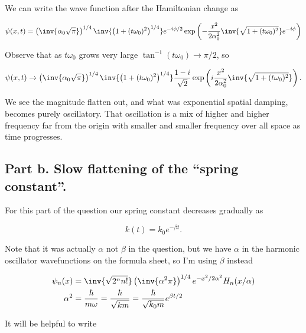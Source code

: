 We can write the wave function after the Hamiltonian change as

\begin{equation}\label{eqn:qmTwoExamReflection:310b}
\psi(x, t) = 
\left( \inv{\alpha_0 \sqrt{\pi}} \right)^{1/4}
\inv{\left( 1 + (t \omega_0)^2 \right)^{1/4}}
e^{-i \phi/2}
\exp\left(
-\frac{x^2}{2 \alpha_0^2} \inv{\sqrt{1 + (t \omega_0)^2}} e^{-i \phi}
\right)
\end{equation}

Observe that as $t \omega_0$ grows very large $\tan^{-1}(t \omega_0) \rightarrow \pi/2$, so 

\begin{equation}\label{eqn:qmTwoExamReflection:310c}
\psi(x, t) \rightarrow
\left( \inv{\alpha_0 \sqrt{\pi}} \right)^{1/4}
\inv{\left( 1 + (t \omega_0)^2 \right)^{1/4}}
\frac{1 - i}{\sqrt{2}}
\exp\left(
i\frac{x^2}{2 \alpha_0^2} \inv{\sqrt{1 + (t \omega_0)^2}} 
\right).
\end{equation}

We see the magnitude flatten out, and what was exponential spatial damping, becomes purely oscillatory.  That oscillation is a mix of higher and higher frequency far from the origin with smaller and smaller frequency over all space as time progresses.

\subsection{Part b.  Slow flattening of the ``spring constant''.}

For this part of the question our spring constant decreases gradually as

\begin{equation}\label{eqn:qmTwoExamReflection:990}
k(t) = k_0 e^{-\beta t}.
\end{equation}

Note that it was actually $\alpha$ not $\beta$ in the question, but we have $\alpha$ in the harmonic oscillator wavefunctions on the formula sheet, so I'm using $\beta$ instead

\begin{align}\label{eqn:qmTwoExamReflection:1010}
\psi_n(x) &= \inv{\sqrt{2^n n!}} \left(\inv{\alpha^2 \pi}\right)^{1/4} e^{-x^2/2\alpha^2} H_n(x/\alpha) \\
\alpha^2 &= \frac{\hbar}{m \omega} 
= \frac{\hbar}{\sqrt{k m}} 
= \frac{\hbar}{\sqrt{k_0 m}} e^{\beta t/2}
\end{align}

It will be helpful to write

